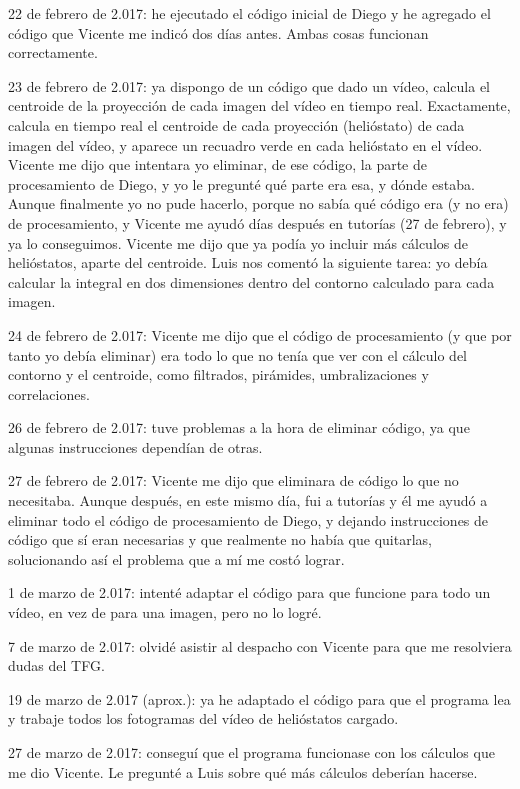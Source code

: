 22 de febrero de 2.017: he ejecutado el código inicial de Diego y he agregado el código que Vicente me indicó dos días antes. Ambas cosas funcionan correctamente.

23 de febrero de 2.017: ya dispongo de un código que dado un vídeo, calcula el centroide de la proyección de cada imagen del vídeo en tiempo real. Exactamente, calcula en tiempo real el centroide de cada proyección (helióstato) de cada imagen del vídeo, y aparece un recuadro verde en cada helióstato en el vídeo. Vicente me dijo que intentara yo eliminar, de ese código, la parte de procesamiento de Diego, y yo le pregunté qué parte era esa, y dónde estaba. Aunque finalmente yo no pude hacerlo, porque no sabía qué código era (y no era) de procesamiento, y Vicente me ayudó días después en tutorías (27 de febrero), y ya lo conseguimos. Vicente me dijo que ya podía yo incluir más cálculos de helióstatos, aparte del centroide. Luis nos comentó la siguiente tarea: yo debía calcular la integral en dos dimensiones dentro del contorno calculado para cada imagen.

24 de febrero de 2.017: Vicente me dijo que el código de procesamiento (y que por tanto yo debía eliminar) era todo lo que no tenía que ver con el cálculo del contorno y el centroide, como filtrados, pirámides, umbralizaciones y correlaciones.

26 de febrero de 2.017: tuve problemas a la hora de eliminar código, ya que algunas instrucciones dependían de otras.

27 de febrero de 2.017: Vicente me dijo que eliminara de código lo que no necesitaba. Aunque después, en este mismo día, fui a tutorías y él me ayudó a eliminar todo el código de procesamiento de Diego, y dejando instrucciones de código que sí eran necesarias y que realmente no había que quitarlas, solucionando así el problema que a mí me costó lograr.

1 de marzo de 2.017: intenté adaptar el código para que funcione para todo un vídeo, en vez de para una imagen, pero no lo logré.

7 de marzo de 2.017: olvidé asistir al despacho con Vicente para que me resolviera dudas del TFG.

19 de marzo de 2.017 (aprox.): ya he adaptado el código para que el programa lea y trabaje todos los fotogramas del vídeo de helióstatos cargado.

27 de marzo de 2.017: conseguí que el programa funcionase con los cálculos que me dio Vicente. Le pregunté a Luis sobre qué más cálculos deberían hacerse.

